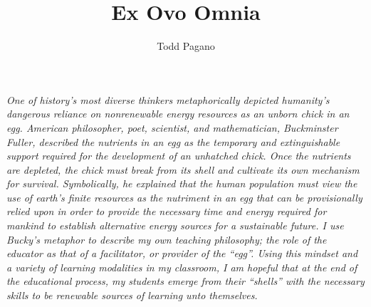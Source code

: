 \documentclass[11.5pt]{sig-alternate} %
\makeatletter
\let\oldabstract\abstract
\let\oldendabstract\endabstract
\renewenvironment{abstract} %
{\renewenvironment{quotation}%
               {\list{}{\addtolength{\leftmargin}{1em} %
                        \listparindent 1.5em%
                        \itemindent    \listparindent%
                        \rightmargin   \leftmargin%
                        \parsep        \z@ \@plus\p@}%
                \item\relax}%
               {\endlist}%
\oldabstract}
{\oldendabstract}
\makeatother
\begin{document}
\title{Ex Ovo Omnia}

\author[1]{\large \color{blue}Todd Pagano}


\toappear{}
\maketitle
\begin{@twocolumnfalse} 
\begin{abstract}
\item 
\textit{One of history’s most diverse thinkers metaphorically depicted humanity’s dangerous reliance on nonrenewable energy resources as an unborn chick in an egg. American philosopher, poet, scientist, and mathematician, Buckminster Fuller, described the nutrients in an egg as the temporary and extinguishable support required for the development of an unhatched chick. Once the nutrients are depleted, the chick must break from its shell and cultivate its own mechanism for survival. Symbolically, he explained that the human population must view the use of earth’s finite resources as the nutriment in an egg that can be provisionally relied upon in order to provide the necessary time and energy required for mankind to establish alternative energy sources for a sustainable future. I use Bucky’s metaphor to describe my own teaching philosophy; the role of the educator as that of a facilitator, or provider of the “egg”. Using this mindset and a variety of learning modalities in my classroom, I am hopeful that at the end of the educational process, my students emerge from their “shells” with the necessary skills to be renewable sources of learning unto themselves.}
\\ \\

\end{abstract}
\end{@twocolumnfalse}

\end{document}
